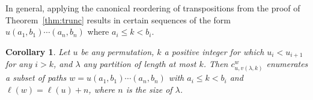 \documentclass[11pt]{amsart}
\newtheorem{corollary}[theorem]{Corollary}
\theoremstyle{definition}
\theoremstyle{remark}
\numberwithin{equation}{section}
\begin{document}
In general, applying the canonical reordering of transpositions from the proof of Theorem~\ref{thm:trunc} results in certain sequences of the form $u (a_1,b_1) \cdots (a_n,b_n)$ where $a_i \leq k < b_i$.

\begin{corollary}
  Let $u$ be any permutation, $k$ a positive integer for which $u_i < u_{i+1}$ for any $i>k$, and $\lambda$ any partition of length at most $k$. Then $c^{w}_{u,v(\lambda,k)}$ enumerates a subset of paths $w = u (a_1,b_1) \cdots (a_n,b_n)$ with $a_i \leq k < b_i$ and $\ell(w) = \ell(u)+n$, where $n$ is the size of $\lambda$.
  \label{cor:schub-schur}
\end{corollary}



%
%


 

\end{document}
